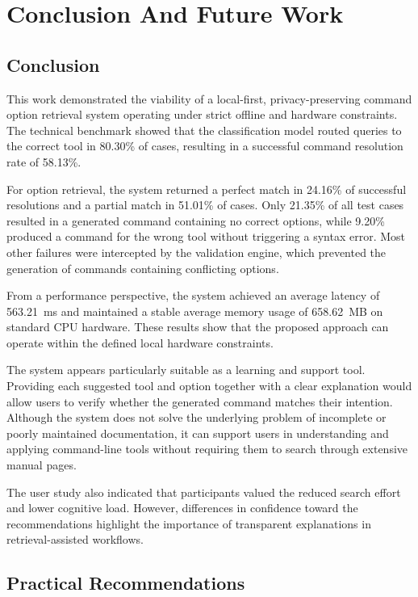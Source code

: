 \section{Conclusion And Future Work}

\subsection{Conclusion}

This work demonstrated the viability of a local-first, privacy-preserving command option retrieval system operating under strict offline and hardware constraints. The technical benchmark showed that the classification model routed queries to the correct tool in 80.30\% of cases, resulting in a successful command resolution rate of 58.13\%.

For option retrieval, the system returned a perfect match in 24.16\% of successful resolutions and a partial match in 51.01\% of cases. Only 21.35\% of all test cases resulted in a generated command containing no correct options, while 9.20\% produced a command for the wrong tool without triggering a syntax error. Most other failures were intercepted by the validation engine, which prevented the generation of commands containing conflicting options.

From a performance perspective, the system achieved an average latency of 563.21~ms and maintained a stable average memory usage of 658.62~MB on standard CPU hardware. These results show that the proposed approach can operate within the defined local hardware constraints.

The system appears particularly suitable as a learning and support tool. Providing each suggested tool and option together with a clear explanation would allow users to verify whether the generated command matches their intention. Although the system does not solve the underlying problem of incomplete or poorly maintained documentation, it can support users in understanding and applying command-line tools without requiring them to search through extensive manual pages.

The user study also indicated that participants valued the reduced search effort and lower cognitive load. However, differences in confidence toward the recommendations highlight the importance of transparent explanations in retrieval-assisted workflows.

\subsection{Practical Recommendations}

